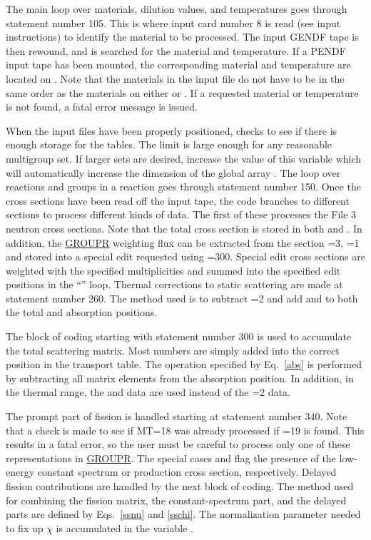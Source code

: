 The main loop over materials, dilution values, and temperatures
goes through statement number 105.  This is where input card number
8 is read (see input instructions) to identify the material to
be processed.  The input GENDF tape is then rewound,  and 
is searched for the material and temperature.  If a PENDF input tape
has been mounted, the corresponding material and temperature are
located on .  Note that the materials in the input
file do not have to be in the same order as the materials on either
 or .  If a requested material or temperature
is not found, a fatal error message is issued.

When the input files have been properly positioned, 
checks to see if there is enough storage for the tables.  The
limit  is large enough for any reasonable
multigroup set.  If larger sets are desired, increase the value of
this variable which will
automatically increase the dimension of the global array .
The loop over reactions and groups in a reaction goes through
statement number 150.  Once the cross sections have been read
off the input tape, the code branches to different sections to
process different kinds of data.  The first of these processes
the File 3 neutron cross sections.  Note that the total cross
section is stored in both  and .  In
addition, the \hyperlink{sGROUPRhy}{GROUPR}
weighting flux can be extracted from the
section =3, =1 and stored into a special edit
requested using
=300.  Special edit cross sections are weighted with the
specified multiplicities and summed into the specified edit
positions in the ``'' loop.  Thermal
corrections to static scattering are made at statement number 260.
The method used is to subtract =2 and add 
and  to both the total and absorption positions.

The block of coding starting with statement number 300 is used to
accumulate the total scattering matrix.  Most numbers are simply
added into the correct position in the transport table.  The
operation specified by Eq.~\ref{abs} is performed by subtracting
all matrix elements from the absorption position.  In addition,
in the thermal range, the  and   data are used instead
of the =2 data.

The prompt part of fission is handled starting at statement number
340.  Note that a check is made to see if MT=18 was already processed
if =19 is found.  This results in a fatal error, so the user must
be careful to process only one of these representations in
\hyperlink{sGROUPRhy}{GROUPR}.
The special cases  and  flag the
presence of the low-energy constant spectrum or production cross
section, respectively.  Delayed fission contributions are handled
by the next block of coding.  The method used for combining
the fission matrix, the constant-spectrum part, and the delayed
parts are defined by Eqs.~\ref{ssnu} and \ref{sschi}.  The
normalization parameter needed to fix up $\chi$ is accumulated in
the variable .

